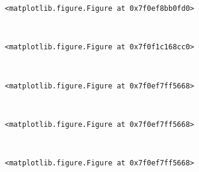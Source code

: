 \documentclass[11pt]{article}
\begin{document}
    
    \begin{verbatim}
<matplotlib.figure.Figure at 0x7f0ef8bb0fd0>
    \end{verbatim}

    
    \begin{center}
    \end{center}
    { \hspace*{\fill} \\}
    
    
    \begin{verbatim}
<matplotlib.figure.Figure at 0x7f0f1c168cc0>
    \end{verbatim}

    
    \begin{center}
    \end{center}
    { \hspace*{\fill} \\}
    
    
    \begin{verbatim}
<matplotlib.figure.Figure at 0x7f0ef7ff5668>
    \end{verbatim}

    
    \begin{center}
    \end{center}
    { \hspace*{\fill} \\}
    
    
    \begin{verbatim}
<matplotlib.figure.Figure at 0x7f0ef7ff5668>
    \end{verbatim}

    
    \begin{center}
    \end{center}
    { \hspace*{\fill} \\}
    
    
    \begin{verbatim}
<matplotlib.figure.Figure at 0x7f0ef7ff5668>
    \end{verbatim}

    
    \begin{center}
    \end{center}
    { \hspace*{\fill} \\}
    
\end{document}
